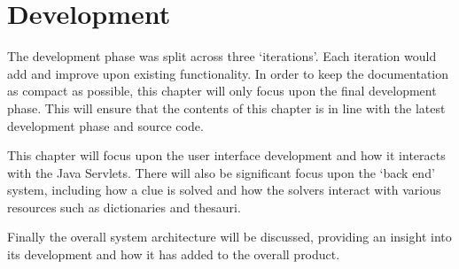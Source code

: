 \chapter{Development}
\label{cha:development}

The development phase was split across three `iterations'. Each iteration would
add and improve upon existing functionality. In order to keep the documentation
as compact as possible, this chapter will only focus upon the final development 
phase. This will ensure that the contents of this chapter is in line with the 
latest development phase and source code.

This chapter will focus upon the user interface development and how it interacts
with the Java Servlets. There will also be significant focus upon the `back 
end' system, including how a clue is solved and how the solvers interact with 
various resources such as dictionaries and thesauri. 

Finally the overall system architecture will be discussed, providing an insight 
into its development and how it has added to the overall product.

\newpage


\newpage


\newpage


\newpage


\newpage


\newpage


\newpage


\newpage

